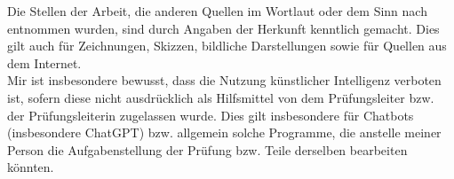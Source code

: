 \documentclass[11pt,a4paper,twoside,headsepline,numbers=noenddot,toc=bibliography,cleardoublepage=empty,parskip=half,DIV=calc,BCOR=6mm,pagesize=pdftex]{article}
\begin{document}
Die Stellen der Arbeit, die anderen Quellen im Wortlaut oder dem Sinn nach entnommen wurden, sind durch Angaben der Herkunft kenntlich gemacht. Dies gilt auch für Zeichnungen, Skizzen, bildliche Darstellungen sowie für Quellen aus dem Internet.\\

Mir ist insbesondere bewusst, dass die Nutzung künstlicher Intelligenz verboten ist, sofern diese nicht ausdrücklich als Hilfsmittel von dem Prüfungsleiter bzw. der Prüfungsleiterin zugelassen wurde. Dies gilt insbesondere für Chatbots (insbesondere ChatGPT) bzw. allgemein solche Programme, die anstelle meiner Person die Aufgabenstellung der Prüfung bzw. Teile derselben bearbeiten könnten.\\

\vspace{10cm}
\begin{flushleft}
\makebox[.4\textwidth]{\hrulefill}\hfill \makebox[.4\textwidth]{\hrulefill}\\
\hfill
{}\\
\end{flushleft}
\end{document}
